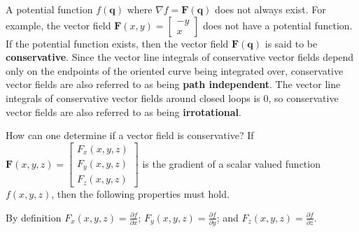 \documentclass{article}
\begin{document}
A potential function \(f(\mathbf{q})\) where \(\nabla f = \mathbf{F}(\mathbf{q})\) does not always exist. For example, the vector field \(\mathbf{F}(x,y) = \begin{bmatrix} -y \\ x \end{bmatrix}\) does not have a potential function. If the potential function exists, then the vector field \(\mathbf{F}(\mathbf{q})\) is said to be {\bf conservative}. Since the vector line integrals of conservative vector fields depend only on the endpoints of the oriented curve being integrated over, conservative vector fields are also referred to as being {\bf path independent}. The vector line integrals of conservative vector fields around closed loops is \(0\), so conservative vector fields are also referred to as being {\bf irrotational}. 

How can one determine if a vector field is conservative? If \(\mathbf{F}(x,y,z) = \begin{bmatrix} F_x(x,y,z) \\ F_y(x,y,z) \\ F_z(x,y,z) \end{bmatrix}\) is the gradient of a scalar valued function \(f(x,y,z)\), then the following properties must hold. 

By definition \(F_x(x,y,z) = \frac{\partial f}{\partial x}\); \(F_y(x,y,z) = \frac{\partial f}{\partial y}\); and \(F_z(x,y,z) = \frac{\partial f}{\partial z}\). 
\end{document}
